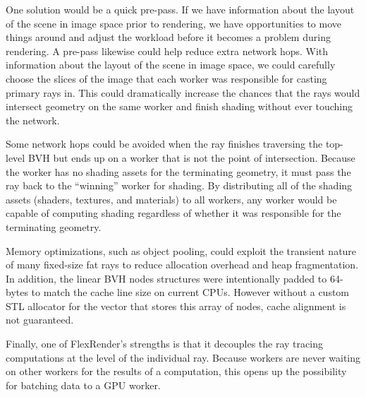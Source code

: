 \documentclass[a4paper,twoside]{article}
\begin{document}
One solution would be a quick pre-pass. If we have information about the
layout of the scene in image space prior to rendering, we have opportunities
to move things around and adjust the workload before it becomes a problem
during rendering. A pre-pass likewise could help reduce extra network hops.
With information about the layout of the scene in image space, we could
carefully choose the slices of the image that each worker was responsible for
casting primary rays in. This could dramatically increase the chances that the
rays would intersect geometry on the same worker and finish shading without
ever touching the network.

Some network hops could be avoided when the ray finishes traversing the
top-level BVH but ends up on a worker that is not the point of intersection.
Because the worker has no shading assets for the terminating geometry, it must
pass the ray back to the ``winning'' worker for shading. By distributing all
of the shading assets (shaders, textures, and materials) to all workers, any
worker would be capable of computing shading regardless of whether it was
responsible for the terminating geometry.

Memory optimizations, such as object pooling, could exploit the transient nature
of many fixed-size fat rays to reduce allocation overhead and heap fragmentation.
In addition, the linear BVH nodes structures were intentionally padded to
64-bytes to match the cache line size on current CPUs. However without a custom
STL allocator for the vector that stores this array of nodes, cache alignment
is not guaranteed.

Finally, one of FlexRender's strengths is that it decouples the ray tracing
computations at the level of the individual ray. Because workers are never
waiting on other workers for the results of a computation, this opens up the
possibility for batching data to a GPU worker.


{\small
}

\vfill
\end{document}
